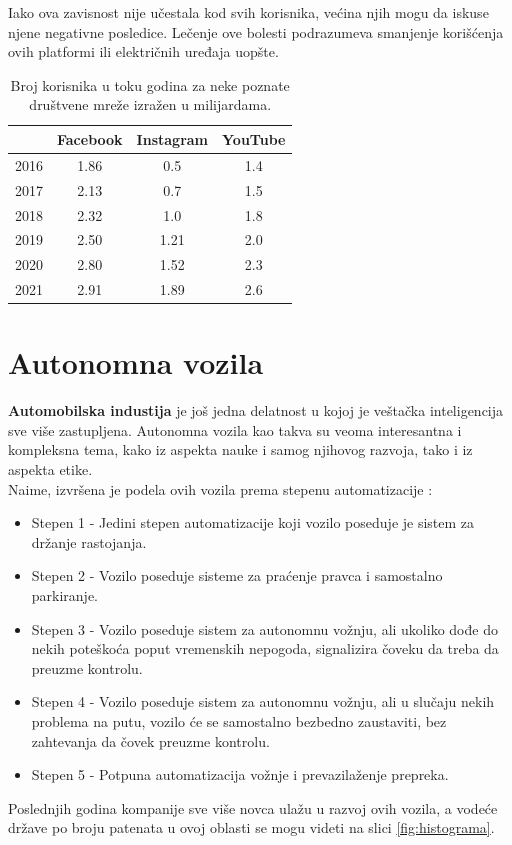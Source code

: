 \documentclass[a4paper]{article}
\begin{document}
Iako ova zavisnost nije učestala kod svih korisnika, većina njih mogu da iskuse njene negativne posledice. Lečenje ove bolesti podrazumeva smanjenje korišćenja ovih platformi ili električnih uređaja uopšte.


\begin{table}[h!]
\begin{center}

\begin{tabular}{|c|c|c|c|} \hline
 & Facebook & Instagram & YouTube\\ \hline
2016 & 1.86 & 0.5 & 1.4 \\ \hline
2017 & 2.13 & 0.7 & 1.5\\ \hline
2018 & 2.32 & 1.0 & 1.8 \\ \hline
2019 & 2.50 & 1.21 & 2.0 \\ \hline
2020 & 2.80 & 1.52 & 2.3 \\ \hline
2021 & 2.91 & 1.89 & 2.6 \\ \hline
\end{tabular}
\label{tab:tabela1}
\end{center}
\caption{Broj korisnika u toku godina za neke poznate društvene mreže izražen u milijardama.}
\end{table}
 


\section{Autonomna vozila}
\label{sec:Autonomna vozila}
\textbf{Automobilska industija} je još jedna delatnost u kojoj je veštačka inteligencija sve više zastupljena. Autonomna vozila kao takva su veoma interesantna i kompleksna tema, kako iz aspekta nauke i samog njihovog razvoja, tako i iz aspekta etike.\\
Naime, izvršena je podela ovih vozila prema stepenu automatizacije \cite{stepen_automonije}:
\begin{itemize}
 \item {Stepen 1 - Jedini stepen automatizacije koji vozilo poseduje je sistem za držanje rastojanja.}
 \item {Stepen 2 - Vozilo poseduje sisteme za praćenje pravca i samostalno parkiranje.}
 \item {Stepen 3 - Vozilo poseduje sistem za autonomnu vožnju, ali ukoliko dođe do nekih poteškoća poput vremenskih nepogoda, signalizira čoveku da treba da preuzme kontrolu.}
 \item {Stepen 4 - Vozilo poseduje sistem za autonomnu vožnju, ali u slučaju nekih problema na putu, vozilo će se samostalno bezbedno zaustaviti, bez zahtevanja da čovek preuzme kontrolu.}
 \item {Stepen 5 - Potpuna automatizacija vožnje i prevazilaženje prepreka.}
\end{itemize} 
Poslednjih godina kompanije sve više novca ulažu u razvoj ovih vozila, a vodeće države po broju patenata u ovoj oblasti se mogu videti na slici \ref{fig:histograma}.
\end{document}

